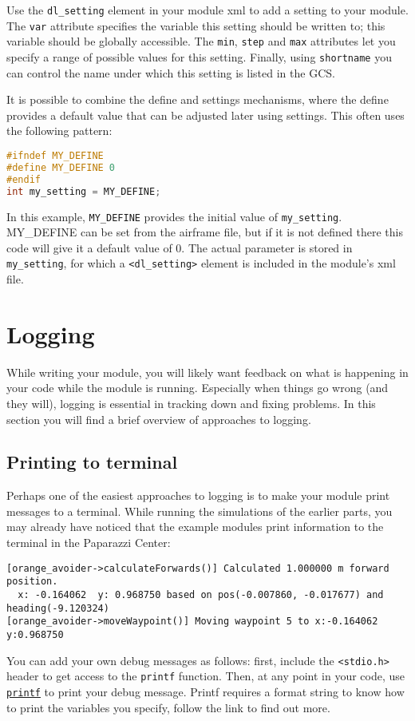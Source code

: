 \documentclass{article}
\begin{document}
Use the \texttt{dl\_setting} element in your module xml to add a setting to your module. The \texttt{var} attribute specifies the variable this setting should be written to; this variable should be globally accessible. The \texttt{min}, \texttt{step} and \texttt{max} attributes let you specify a range of possible values for this setting. Finally, using \texttt{shortname} you can control the name under which this setting is listed in the GCS.

It is possible to combine the define and settings mechanisms, where the define provides a default value that can be adjusted later using settings. This often uses the following pattern:
\begin{lstlisting}[language=c]
#ifndef MY_DEFINE
#define MY_DEFINE 0
#endif
int my_setting = MY_DEFINE;
\end{lstlisting}
In this example, \texttt{MY\_DEFINE} provides the initial value of \texttt{my\_setting}. MY\_DEFINE can be set from the airframe file, but if it is not defined there this code will give it a default value of 0. The actual parameter is stored in \texttt{my\_setting}, for which a \texttt{<dl\_setting>} element is included in the module's xml file.





\section{Logging}
While writing your module, you will likely want feedback on what is happening in your code while the module is running. Especially when things go wrong (and they will), logging is essential in tracking down and fixing problems. In this section you will find a brief overview of approaches to logging.

\subsection{Printing to terminal}
Perhaps one of the easiest approaches to logging is to make your module print messages to a terminal. While running the simulations of the earlier parts, you may already have noticed that the example modules print information to the terminal in the Paparazzi Center:
\begin{lstlisting}
[orange_avoider->calculateForwards()] Calculated 1.000000 m forward position.
  x: -0.164062  y: 0.968750 based on pos(-0.007860, -0.017677) and heading(-9.120324)
[orange_avoider->moveWaypoint()] Moving waypoint 5 to x:-0.164062 y:0.968750
\end{lstlisting}
You can add your own debug messages as follows: first, include the \texttt{<stdio.h>} header to get access to the \texttt{printf} function. Then, at any point in your code, use \href{http://www.cplusplus.com/reference/cstdio/printf/}{\texttt{printf}} to print your debug message. Printf requires a format string to know how to print the variables you specify, follow the link to find out more.
\end{document}
